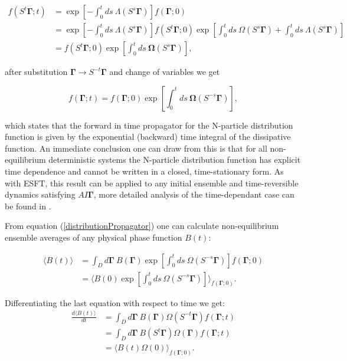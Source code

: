\documentclass[a4paper,12pt]{article}
\begin{document}
\begin{equation}
\begin{aligned}
  f(S^t\bm{\Gamma};t) &= \exp[-\int_0^t ds\ \Lambda(S^s\bm{\Gamma})]f(\bm{\Gamma};0)\\
  &=\exp[-\int_0^t ds\ \Lambda(S^s\bm{\Gamma})]f(S^t \bm{\Gamma};0) \exp[\int_0^t ds\ \Omega(S^s \bm{\Gamma}) + \int_0^t ds\ \Lambda(S^s\bm{\Gamma})]\\
  &=f(S^t \bm{\Gamma};0) \exp[\int_0^t ds\ \bm{\Omega}(S^s \bm{\Gamma})],
\end{aligned}
\end{equation}

after substitution $\bm{\Gamma} \to S^{-t}\bm{\Gamma}$ and change of variables we get 

\begin{equation}
\label{distributionPropagator}
    f(\bm{\Gamma};t)=f(\bm{\Gamma};0)\exp[\int_0^t ds\ \bm{\Omega}(S^{-s} \bm{\Gamma})],
\end{equation}

which states that the forward in time propagator for the N-particle distribution function is given by the exponential (backward) time integral of the dissipative function. 
An immediate conclusion one can draw from this is that for all non-equilibrium deterministic systems the N-particle distribution function has explicit time dependence and cannot be written in a closed, time-stationary form.
As with ESFT, this result can be applied to any initial ensemble and time-reversible dynamics satisfying $AI\bm{\Gamma}$, more detailed analysis of the time-dependant case can be found in \cite{Williams:2008ft}.


From equation (\ref{distributionPropagator}) one can calculate non-equilibrium ensemble averages of any physical phase function $B(t)$:

\begin{equation}
\begin{aligned}
	  \langle B(t) \rangle &= \int_D d\bm{\Gamma}\ B(\bm{\Gamma})\exp[\int_0^{t} ds\ \Omega(S^{-s}\bm{\Gamma})]f(\bm{\Gamma};0)\\
	  &= \langle B(0) \exp[\int_0^{t} ds\ \Omega(S^{-s}\bm{\Gamma})] \rangle_{f(\bm{\Gamma};0)}.
\end{aligned}
\end{equation}

Differentiating the last equation with respect to time we get:
\begin{equation}
\begin{aligned}
 \frac{d\langle B(t) \rangle}{dt}
 &= \int_D d\bm{\Gamma}\ B(\bm{\Gamma}) \Omega(S^{-t}\bm{\Gamma}) f(\bm{\Gamma};t)\\
&= \int_D d\bm{\Gamma}\ B(S^t \bm{\Gamma}) \Omega(\bm{\Gamma})f(\bm{\Gamma};t)\\
&= \langle B(t)\Omega(0) \rangle_{f(\bm{\Gamma};0)}.
\end{aligned}
\end{equation}
\end{document}
